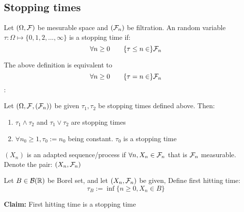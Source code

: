 \newpage
\subsection*{Stopping times}
\begin{dfn}
Let $(\Omega, \mathcal{F})$ be mesurable space and $(\mathcal{F}_n)$ be filtration. An random variable $\tau: \Omega \mapsto \{0,1,2, ..., \infty\}$ is a stopping time if:
\begin{equation*}
    \forall n\geq 0 \qquad \{\tau \leq n \in \}\mathcal{F}_n
\end{equation*}
\end{dfn}

\begin{rem}
The above definition is equivalent to 
\begin{equation*}
    \forall n\geq 0 \qquad \{\tau = n \in \}\mathcal{F}_n
\end{equation*}
\pf:
\vspace{4cm}
\end{rem}
\begin{lem}
Let $(\Omega, \mathcal{F}, (\mathcal{F}_n))$ be given $\tau_1, \tau_2$ be stopping times defined above. Then:
\begin{enumerate}
    \item $\tau_1\wedge \tau_2$ and $\tau_1\vee \tau_2$ are stopping times
    \item $\forall n_0 \geq 1, \tau_0 := n_0$ being constant. $\tau_0$ is a stopping time
\end{enumerate}
\end{lem}
\pf 
\vspace{8cm}
\begin{dfn} $(X_n)$ is an adapted sequence/process if $\forall n, X_n \in \mathcal{F}_n$ that is $\mathcal{F}_n$ measurable. Denote the pair: $(X_n, \mathcal{F}_n)$

\end{dfn}
\newpage
\begin{dfn}
Let $B\in \mathcal{B}(\mathbb{R})$ be Borel set, and let $(X_n, \mathcal{F}_n)$ be given, Define first hitting time: 
\begin{equation*}
    \tau_B := \inf \{n\geq 0, X_n\in B\}
\end{equation*}
\end{dfn}
\textbf{Claim:} First hitting time is a stopping time \\
\pf \vspace{4cm}

